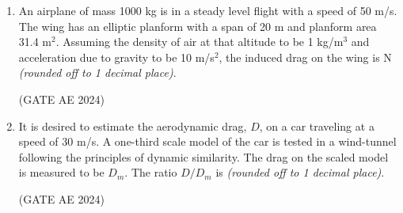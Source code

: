 \documentclass[journal,12pt,onecolumn]{IEEEtran}
\theoremstyle{remark}
\begin{document}
\begin{flushleft}
\begin{enumerate}
\item An airplane of mass 1000 kg is in a steady level flight with a speed of 50 m/s. The wing has an elliptic planform with a span of 20 m and planform area 31.4 m$^2$. Assuming the density of air at that altitude to be 1 kg/m$^3$ and acceleration due to gravity to be 10 m/s$^2$, the induced drag on the wing is \underline{\hspace{3cm}} N \textit{(rounded off to 1 decimal place)}.

\hfill (GATE AE 2024)

\item It is desired to estimate the aerodynamic drag, $D$, on a car traveling at a speed of 30 m/s. A one-third scale model of the car is tested in a wind-tunnel following the principles of dynamic similarity. The drag on the scaled model is measured to be $D_m$. The ratio $D/D_m$ is \underline{\hspace{3cm}} \textit{(rounded off to 1 decimal place)}.

\hfill (GATE AE 2024)

\end{enumerate}
\end{flushleft}
\end{document}
